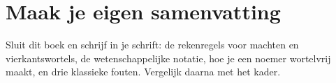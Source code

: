 \begin{oefeningen}




\end{oefeningen}


\ifzelfstudie
\section*{Maak je eigen samenvatting}
Sluit dit boek en schrijf in je schrift: de rekenregels voor machten en vierkantswortels, de wetenschappelijke notatie, hoe je een noemer wortelvrij maakt, en drie klassieke fouten. Vergelijk daarna met het kader.
\fi
